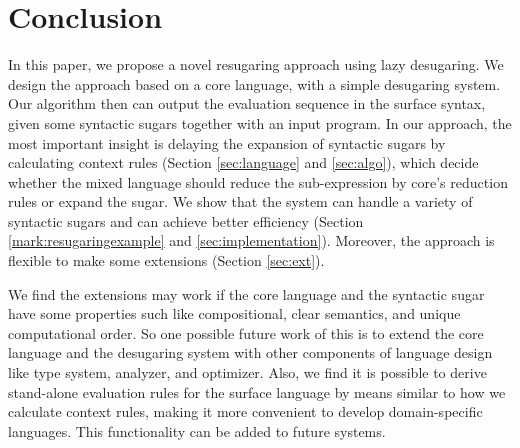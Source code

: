 \section{Conclusion}
\label{sec7}


In this paper, we propose a novel resugaring approach using lazy desugaring. We design the approach based on a  core language, with a simple desugaring system. Our algorithm then can output the evaluation sequence in the surface syntax, given some syntactic sugars together with an input program. In our approach, the most important insight is delaying the expansion of syntactic sugars by calculating context rules (Section \ref{sec:language} and \ref{sec:algo}), which decide whether the mixed language should reduce the sub-expression by core's reduction rules or expand the sugar. We show that the system can handle a variety of syntactic sugars and can achieve better efficiency (Section \ref{mark:resugaringexample} and \ref{sec:implementation}). Moreover, the approach is flexible to make some extensions (Section \ref{sec:ext}).

We find the extensions may work if the core language and the syntactic sugar have some properties such like compositional, clear semantics, and unique computational order. So one possible future work of this is to extend the core language and the desugaring system with other components of language design like type system, analyzer, and optimizer. Also, we find it is possible to derive stand-alone evaluation rules for the surface language by means similar to how we calculate context rules, making it more convenient to develop domain-specific languages. This functionality can be added to future systems.
